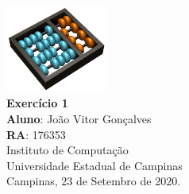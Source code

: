 \documentclass[12pt,a4paper]{report}
\begin{document}
\begin{titlepage}
        \begin{center}
                \vspace*{1cm}
                \includegraphics[width=0.25\textwidth]{Logo}\\
                \vspace{1.5cm}
                \Huge
                \textbf{Exercício 1}\\
                \vspace{1.5cm}
                \Large
                \textbf{Aluno}: João Vitor Gonçalves\\
                \textbf{RA}: 176353\\
                \vspace{1.2cm}
                \Large
                Instituto de Computação\\
                Universidade Estadual de Campinas\\
                \vspace{1.5cm}
                Campinas, 23 de Setembro de 2020.
        \end{center}
\end{titlepage}
\tableofcontents
\clearpage

\newcommand{\shellcmd}[1]{\texttt{\footnotesize\# #1}}%



\end{document}
